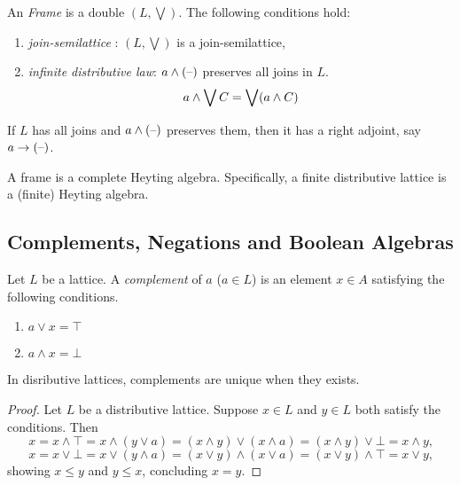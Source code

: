 \begin{definition} [frames]
An {\em Frame} is a double $(L,\bigvee)$.
The following conditions hold:
\begin{enumerate}
\item {\em join-semilattice }: $(L,\bigvee)$ is a join-semilattice,
\item {\em infinite distributive law}:  
$a \wedge {(\mbox{\textendash})}$ preserves all joins in $L$. 
\[ a \wedge \bigvee C = \bigvee (a \wedge C)\]
\end{enumerate}
\end{definition}
\begin{proposition} 
If $L$ has all joins and $ a \wedge {(\mbox{\textendash})}$ preserves them, 
then it has a right adjoint, say $a \to {(\mbox{\textendash})}$. 
\end{proposition}
\begin{corollary}
A frame is a complete Heyting algebra.
Specifically, a finite distributive lattice is a (finite) Heyting algebra. 
\end{corollary}
\subsection{Complements, Negations and Boolean Algebras}

\begin{definition}[complement]\label{complement}
Let $L$ be a lattice. A {\em complement}  of $a$ ($a \in L$) is an element $ x \in A$ satisfying the following conditions.
\begin{enumerate}
\item $a \vee x = \top$
\item $a \wedge x = \bot$ 
\end{enumerate}
\end{definition}

\begin{proposition} \label{complementIsUnique}
In disributive lattices, complements are unique when they exists.
\end{proposition}
\begin{proof}
Let $L$ be a distributive lattice. 
Suppose $x \in L$ and $y \in L$ both satisfy the conditions. Then
%
\[
x = x \wedge \top
= x \wedge ( y \vee a )
= (x \wedge y)  \vee ( x \wedge a)
= (x \wedge y) \vee \bot
=  x \wedge y  \mbox{,}
\]
%
\[ x = x \vee \bot 
= x \vee ( y \wedge a) = (x \vee y) \wedge (x \vee a) 
= (x \vee y) \wedge \top
= x \vee y \mbox{,}
\]
showing $x \leq y$ and $y \leq x$, concluding $x = y$. 
\end{proof}

